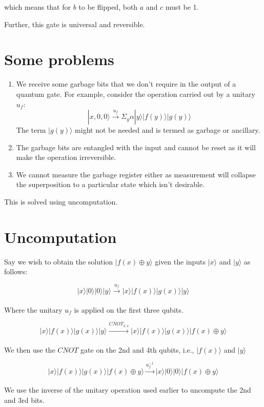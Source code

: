 \documentclass{article}
\begin{document}
which means that for $b$ to be flipped, both $a$ and $c$ must be 1.

Further, this gate is universal and reversible.

\section{Some problems}

\begin{enumerate}
    \item We receive some garbage bits that we don't require in the output of a quantum gate. For example, consider the operation carried out by a unitary $u_f$:
    $$|x,0,0\rangle \xrightarrow[]{u_f} \Sigma_y \alpha |y\rangle |f(y)\rangle |g(y)\rangle $$
    The term $|g(y)\rangle$ might not be needed and is termed as garbage or ancillary.
    \item The garbage bits are entangled with the input and cannot be reset as it will make the operation irreversible.
    \item We cannot measure the garbage register either as measurement will collapse the superposition to a particular state which isn't desirable.
\end{enumerate}
This is solved using uncomputation.

\section {Uncomputation}

Say we wish to obtain the solution $|f(x)\oplus y \rangle$ given the inputs $|x\rangle$ and $|y\rangle$ as follows:

$$|x\rangle |0\rangle |0\rangle |y\rangle \xrightarrow[]{u_f} |x\rangle |f(x)\rangle |g(x)\rangle |y\rangle$$

Where the unitary $u_f$ is applied on the first three qubits.

$$|x\rangle |f(x)\rangle |g(x)\rangle |y\rangle \xrightarrow[]{CNOT_{2,4}} |x\rangle |f(x)\rangle |g(x)\rangle |f(x) \oplus y\rangle$$

We then use the $CNOT$ gate on the 2nd and 4th qubits, i.e., $|f(x)\rangle$ and $|y\rangle$

$$|x\rangle |f(x)\rangle |g(x)\rangle |f(x) \oplus y\rangle \xrightarrow[]{u^{-1}_f} |x\rangle |0\rangle |0\rangle |f(x) \oplus y\rangle$$

We use the inverse of the unitary operation used earlier to uncompute the 2nd and 3rd bits.
\end{document}
